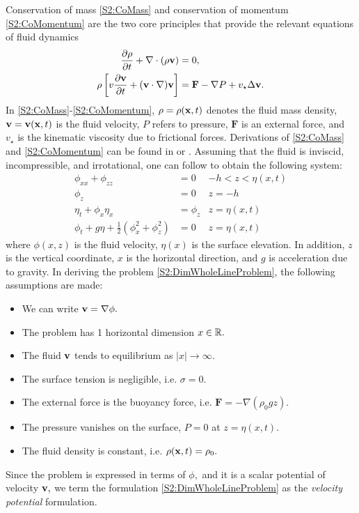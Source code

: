 Conservation of mass \eqref{S2:CoMass} and conservation of momentum \eqref{S2:CoMomentum} are the two core principles that provide the relevant equations of fluid dynamics
\begin{align}
\frac{\partial \rho}{\partial t} + \nabla \cdot (\rho {\bf v}) &= 0, \label{S2:CoMass} \\
\rho\left[ v\frac{\partial {\bf v}}{\partial t} + ({\bf v} \cdot \nabla) {\bf v}\right] &= \textbf{F} - \nabla P + v_{\star} \Delta {\bf v}. \label{S2:CoMomentum}
\end{align}
In \eqref{S2:CoMass}-\eqref{S2:CoMomentum}, $\rho = \rho({\bf x}, t)$ denotes the fluid mass density, ${\bf v} = {\bf v}({\bf x},t)$ is the fluid velocity, $P$ refers to pressure, $\textbf{F}$ is an external force, and $v_{\star}$ is the kinematic viscosity due to frictional forces. Derivations of \eqref{S2:CoMass} and \eqref{S2:CoMomentum} can be found in \cite[Chapter 3]{Johnson} or \cite[Chapter 1]{CM}. Assuming that the fluid is inviscid, incompressible, and irrotational, one can follow \cite[Section 5.1]{Ablowitz} to obtain the following system:
\begin{subequations} \label{S2:DimWholeLineProblem}
\begin{align}
\phi_{xx} + \phi_{zz} &= 0 &-h < z < \eta(x,t) \label{S2:PDE}\\
\phi_{z} &= 0 &z = -h \label{S2:BBC}\\
\eta_t + \phi_{x}\eta_{x} &= \phi_{z} & z = \eta(x,t) \label{S2:KBC}\\
\phi_t + g\eta + \frac{1}{2}(\phi_{x}^2 + \phi_{z}^2) &= 0 &z = \eta(x,t) \label{S2:DBC}
\end{align}
\end{subequations}
where $\phi(x,z)$ is the fluid velocity, $\eta(x)$ is the surface elevation. In addition, $z$ is the vertical coordinate, $x$ is the horizontal direction, and $g$ is acceleration due to gravity. In deriving the problem \eqref{S2:DimWholeLineProblem}, the following assumptions are made:
\begin{itemize}
\item We can write ${\bf v} = \nabla \phi.$
\item The problem has 1 horizontal dimension $x \in \mathbb R.$
\item The fluid ${\bf v}$ tends to equilibrium as $|x| \to \infty.$
\item The surface tension is negligible, i.e. $\sigma = 0.$ 
\item The external force is the buoyancy force, i.e. $\textbf{F} = - \nabla (\rho_0 g z).$
\item The pressure vanishes on the surface, $P = 0$ at $z = \eta(x,t).$
\item The fluid density is constant, i.e. $\rho({\bf x},t) = \rho_0.$
\end{itemize}
Since the problem is expressed in terms of $\phi,$ and it is a scalar potential of velocity ${\bf v},$ we term the formulation \eqref{S2:DimWholeLineProblem} as the \textit{velocity potential} formulation.


